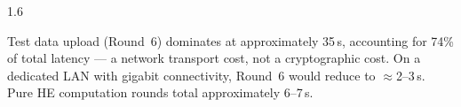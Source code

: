 \begin{spacing}{1.6}

Test data upload (Round~6) dominates at approximately 35\,s, accounting for
74\% of total latency --- a network transport cost, not a cryptographic cost.
On a dedicated LAN with gigabit connectivity, Round~6 would reduce to
$\approx$2--3\,s. Pure HE computation rounds total approximately 6--7\,s.

\end{spacing}